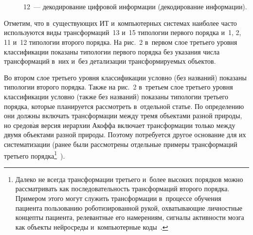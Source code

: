 \begin{multicols}{2}
\vspace*{-6pt}

\pagebreak

\end{multicols}

\begin{figure*} %
\vspace*{1pt}
      \begin{center}
     \mbox{%
\epsfxsize=163mm 
}
\end{center}
\vspace*{-9pt}
\end{figure*}

\begin{multicols}{2}

\noindent
\begin{description}

  \item[\,] 12~--- декодирование цифровой информации (декодирование 
информации).
  \end{description}
  
  Отметим, что в~существующих ИТ
  и~компьютерных системах наиболее часто используются виды 
трансформаций~13 и~15 типологии первого порядка и~1, 2, 11 и~12 типологии 
второго порядка. На рис.~2 в~первом слое третьего уровня классификации 
показаны типологии первого порядка без указания числа трансформаций в~них 
и~без детализации трансформируемых объектов.
  
  Во втором слое третьего уровня классификации условно (без названий) 
показаны типологии второго порядка. Также на рис.~2 в~третьем слое третьего 
уровня классификации условно (также без названий) показаны типологии 
третьего порядка, которые планируется рассмотреть в~отдельной статье. По 
определению они должны включать трансформации между тремя объектами 
разной природы, но средов$\acute{\mbox{а}}$я версия иерархии Акоффа 
включает трансформации только между двумя объектами разной природы. 
Поэтому потребуется другое основание для их систематизации (ранее были 
рассмотрены отдельные примеры трансформаций третьего 
порядка\footnote{Далеко не всегда трансформации третьего и~более высоких порядков можно 
рассматривать как последовательность трансформаций второго порядка. Примером этого могут 
служить трансформации в~процессе обучения пациента пользованию роботизированной рукой, 
охватывающие личностные концепты пациента, релевантные его намерениям, сигналы активности 
мозга как объекты нейросреды и~компьютерные коды~\cite{29-zac}.}~\cite{29-zac}).


\end{multicols}
